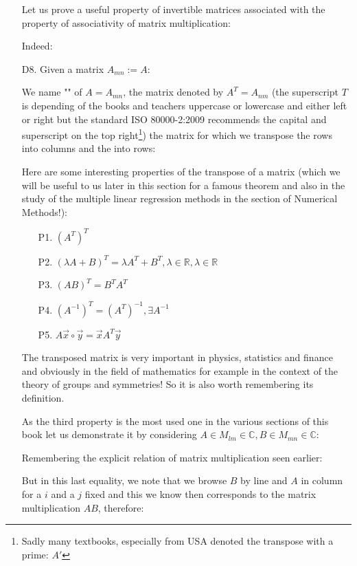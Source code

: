 \begin{enumerate}
		Let us prove a useful property of invertible matrices associated with the property of associativity of matrix multiplication\label{inverse matrix property}:
		
		Indeed:
		
		
		\item[D8.] Given a matrix $A_{mn}:=A$:
		
		We name "\label{transposed matrix}" of $A=A_{mn}$, the matrix denoted by $A^T=A_{nm}$  (the superscript $T$ is depending of the books and teachers uppercase or lowercase and either left or right but the standard ISO 80000-2:2009 recommends the capital and superscript on the top right\footnote{Sadly many textbooks, especially from USA denoted the transpose with a prime: $A'$}) the matrix for which we transpose the rows into columns and the into rows:
		
		Here are some interesting properties of the transpose of a matrix (which we will be useful to us later in this section for a famous theorem and also in the study of the multiple linear regression methods in the section of Numerical Methods!):
		\begin{enumerate}
			\item[P1.] $(A^T)^T$
			\item[P2.] $(\lambda A+B)^T=\lambda A^T+B^T,\lambda\in \mathbb{R},\lambda\in \mathbb{R}$
			\item[P3.] $(AB)^T=B^TA^T$
			\item[P4.] $(A^{-1})^T=(A^T)^{-1},\exists A^{-1}$
			\item[P5.] $A\vec{x}\circ\vec{y}=\vec{x}A^T\vec{y}$
		\end{enumerate}
		The transposed matrix is very important in physics, statistics and finance and obviously in the field of mathematics for example in the context of the theory of groups and symmetries! So it is also worth remembering its definition.
		
		As the third property is the most used one in the various sections of this book let us demonstrate it by considering $A\in M_{lm}\in\mathbb{C},B\in M_{mn}\in \mathbb{C}$:
		\begin{dem}
		 Remembering the explicit relation of matrix multiplication seen earlier:
		
		But in this last equality, we note that we browse $B$ by line and $A$ in column for a $i$ and a $j$ fixed and this we know then corresponds to the matrix multiplication $AB$, therefore:
		

\end{dem}
\end{enumerate}
